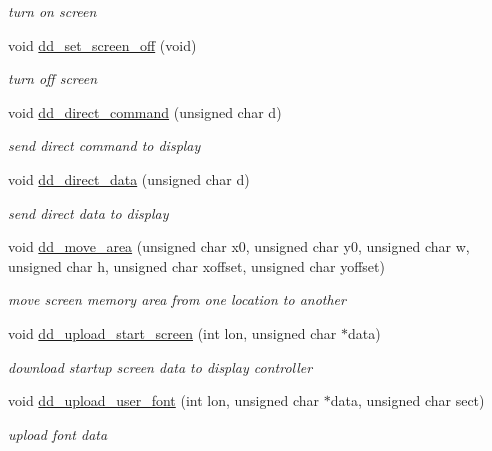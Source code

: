 \begin{DoxyCompactItemize}
\begin{DoxyCompactList}\small\item\em turn on screen \end{DoxyCompactList}\item 
\hypertarget{group__display_gab7c7001528cccf3610b9651364842d91}{void \hyperlink{group__display_gab7c7001528cccf3610b9651364842d91}{dd\-\_\-set\-\_\-screen\-\_\-off} (void)}\label{group__display_gab7c7001528cccf3610b9651364842d91}

\begin{DoxyCompactList}\small\item\em turn off screen \end{DoxyCompactList}\item 
void \hyperlink{group__display_gad27debe11f640b4939c4b6f88d534080}{dd\-\_\-direct\-\_\-command} (unsigned char d)
\begin{DoxyCompactList}\small\item\em send direct command to display \end{DoxyCompactList}\item 
void \hyperlink{group__display_ga5b9f3252e68b2a5b20242f7c0e2f8c77}{dd\-\_\-direct\-\_\-data} (unsigned char d)
\begin{DoxyCompactList}\small\item\em send direct data to display \end{DoxyCompactList}\item 
void \hyperlink{group__display_gae0257daad0038af711eae17127882d94}{dd\-\_\-move\-\_\-area} (unsigned char x0, unsigned char y0, unsigned char w, unsigned char h, unsigned char xoffset, unsigned char yoffset)
\begin{DoxyCompactList}\small\item\em move screen memory area from one location to another \end{DoxyCompactList}\item 
void \hyperlink{group__display_gaa01941111f8ffdbc902e88f198b1a383}{dd\-\_\-upload\-\_\-start\-\_\-screen} (int lon, unsigned char $\ast$data)
\begin{DoxyCompactList}\small\item\em download startup screen data to display controller \end{DoxyCompactList}\item 
void \hyperlink{group__display_gaa6ec3ad2a963ba90eaafd805dbace08b}{dd\-\_\-upload\-\_\-user\-\_\-font} (int lon, unsigned char $\ast$data, unsigned char sect)
\begin{DoxyCompactList}\small\item\em upload font data \end{DoxyCompactList}\item 

\end{DoxyCompactItemize}
